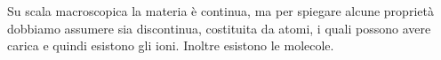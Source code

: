Su scala macroscopica la materia è continua, ma per spiegare alcune proprietà dobbiamo assumere sia discontinua, costituita da atomi, i quali possono avere carica e quindi esistono gli ioni. Inoltre esistono le molecole.